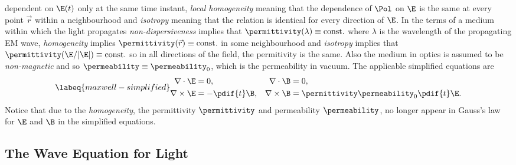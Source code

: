     dependent on \(\E(t)\) only at the same time instant, \emph{local homogeneity} meaning that the dependence of 
    \(\Pol\) on \(\E\) is the same at every point \(\vec{r}\) within a neighbourhood and \emph{isotropy} meaning that 
    the relation is identical for every direction of \(\E\). 
In the terms of a medium within which the light propagates \emph{non-dispersiveness} implies that
    \({\permittivity(\lambda) \equiv\text{const.}}\) where \(\lambda\) is the wavelength of the propagating \ac{EM} wave,
    \emph{homogeneity} implies \({\permittivity(\vec{r}) \equiv \text{const.}}\) in some neighbourhood and \emph{isotropy}
    implies that \({\permittivity({\E}/{|\E|}) \equiv \text{const.}}\) so in all directions of the field, the permitivity is
    the same.
Also the medium in optics is assumed to be \emph{non-magnetic} and so \(\permeability \equiv \permeability_0\), which is
    the permeability in vacuum.
The applicable simplified equations are
    \begin{equation}
        \labeq{maxwell-simplified}
        \begin{aligned}
            \nabla \cdot  \E &= 0, &   \nabla \cdot  \B &= 0, \\  
            \nabla \times \E &= -\pdif{t}\B, & \nabla \times \B &= \permittivity \permeability_0 \pdif{t}\E.
        \end{aligned}
    \end{equation}
Notice that due to the \emph{homogeneity}, the permittivity \(\permittivity\) and permeability \(\permeability\), no
    longer appear in Gauss's law for \(\E\) and \(\B\) in the simplified equations.

\subsection[Wave Equation of Light]{The Wave Equation for Light}

